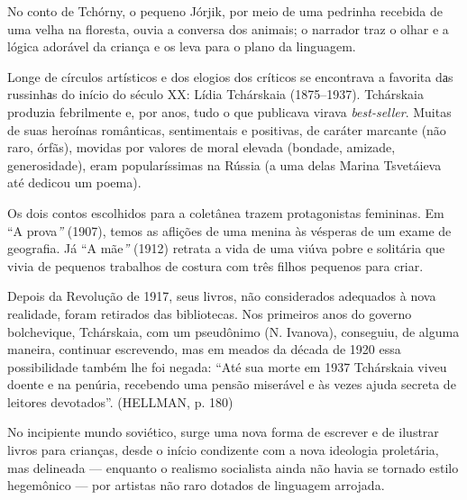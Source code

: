 No conto de Tchórny, o pequeno Jórjik, por meio de uma pedrinha recebida
de uma velha na floresta, ouvia a conversa dos animais; o narrador traz
o olhar e a lógica adorável da criança e os leva para o plano da
linguagem.

Longe de círculos artísticos e dos elogios dos críticos se encontrava a
favorita dаs russinhаs do início do século XX: Lídia Tchárskaia
(1875--1937). Tchárskaia produzia febrilmente e, por anos, tudo o que
publicava virava \emph{best-seller}. Muitas de suas heroínas românticas,
sentimentais e positivas, de caráter marcante (não raro, órfãs), movidas
por valores de moral elevada (bondade, amizade, generosidade), eram
popularíssimas na Rússia (a uma delas Marina Tsvetáieva até dedicou um
poema).

Os dois contos escolhidos para a coletânea trazem protagonistas
femininas. Em ``A prova\emph{''} (1907), temos as aflições de uma menina
às vésperas de um exame de geografia. Já ``A mãe\emph{''} (1912) retrata
a vida de uma viúva pobre e solitária que vivia de pequenos trabalhos de
costura com três filhos pequenos para criar.

Depois da Revolução de 1917, seus livros, não considerados adequados à
nova realidade, foram retirados das bibliotecas. Nos primeiros anos do
governo bolchevique, Tchárskaia, com um pseudônimo (N. Ivanova),
conseguiu, de alguma maneira, continuar escrevendo, mas em meados da
década de 1920 essa possibilidade também lhe foi negada: ``Até sua morte
em 1937 Tchárskaia viveu doente e na penúria, recebendo uma pensão
miserável e às vezes ajuda secreta de leitores devotados''. (HELLMAN, p.
180)

No incipiente mundo soviético, surge uma nova forma de escrever e de
ilustrar livros para crianças, desde o início condizente com a nova
ideologia proletária, mas delineada --- enquanto o realismo socialista
ainda não havia se tornado estilo hegemônico --- por artistas não raro
dotados de linguagem arrojada.

